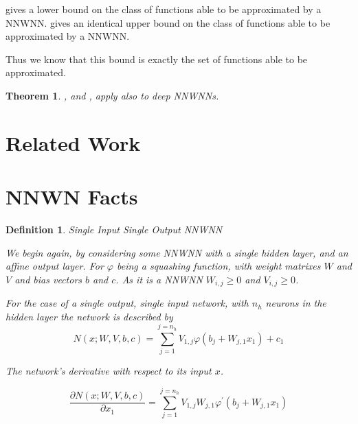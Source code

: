 \documentclass{article} %
\newtheorem{thm}{Theorem}
\newtheorem{defn}{Definition}
\begin{document}
  gives a lower bound on the class of functions able to be approximated by a NNWNN.
 gives an identical upper bound on the class of functions able to be approximated by a NNWNN.

Thus we know that this bound is exactly the set of functions able to be approximated.

\begin{thm}\label{thm:deep}
	,  and ,
	apply also to deep NNWNNs.
\end{thm}

\section{Related Work}

\section{NNWN Facts}

\begin{defn}{Single Input Single Output NNWNN}
	
	We begin again, by considering some NNWNN with a single hidden layer, and an affine output layer.
	For $\varphi$ being a squashing function, with weight matrixes $W$ and $V$ and bias vectors $b$ and $c$.
	As it is a NNWNN $W_{i,j} \ge 0$ and $V_{i,j} \ge 0$.
	
	For the case of a single output, single input network, with $n_h$ neurons in the hidden layer the network is described by
	\begin{equation}
	N(x;W,V,b,c) = \sum_{j=1}^{j=n_h} V_{1,j} \varphi (b_j+W_{j,1}x_1) + c_1
	\end{equation}
	
	The network's derivative with respect to its input $x$.
	
	\begin{equation}
	\frac{\partial N(x;W,V,b,c)}{\partial x_1} = \sum_{j=1}^{j=n_h} V_{1,j}W_{j,1} \varphi^\prime (b_j+W_{j,1}x_1)
	\end{equation}
\end{defn}
\end{document}

